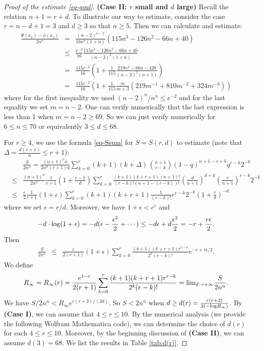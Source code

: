 \documentclass[12pt]{amsart}
\theoremstyle{definition}
\def\lim{{\rm lim}}
\def\log{{\rm log}}
\begin{document}
\begin{proof}[Proof of the estimate \eqref{eq-goal}]
\textbf{(Case II: $r$ small and $d$ large)}
    Recall the relation $n+1=r+d$. 
To illustrate our way to estimate, consider the case $r=n-d+1=3$ and $d\ge 3$ so that $n\ge 5$. 
Then we can calculate and estimate: 
\begin{eqnarray*}
    \frac{\Psi(x_1)-\phi(x_1)}{2n^n}&=& \frac{(n-2)^{n-2}}{16n^n(1+n)}(115n^3-126n^2-66n+40)\\
    &\le& \frac{e^{-2}}{16}\frac{115 n^3-126 n^2-66n+40}{(n-2)^2(1+n)}\\
    &=& \frac{115 e^{-2}}{16}\left(1+\frac{1}{115}\frac{{219} n^2-{66}n-{420}}{(n-2)^2(n+1)}\right)\\
    &=& \frac{115 e^{-2}}{16} \left(1+\frac{1}{115}\frac{m}{m+3}(219 m^{-1}+810 m^{-2}+324 m^{-3})\right)
\end{eqnarray*}
where for the first inequality we used $(n-2)^n/n^n\le e^{-2}$ and for the last equality we set  $m=n-2$. 
One can verify numerically that the last expression is less than 1 when $m=n-2\ge 69$. So we can just verify numerically for $6\le n\le 70$ or equivalently $3\le d\le 68$. 


For $r\ge 4$, we use the formula \eqref{eq-Ssum} for $S=S(r,d)$ to estimate (note that $\Delta=\frac{d(r+1)}{n}\le r+1$):  
\begin{eqnarray*}
    &&\frac{S}{2n^n}
    =\frac{(n+1)^n n}{2 n^n (r+1)d}\sum_{k=0}^{r}(k+1)(k+\Delta)\frac{}{}\binom{n+1}{r-k}(1-q)^{n+1-r+k} q^{r-k} 2^{-k}    
    \\
    &\le &\frac{(n+1)^n}{2n^n}\frac{1}{r+1}\left(1+\frac{r-1}{d}\right)\sum_{k=0}^r \frac{(k+1)(k+r+1)(n+1)!}{(r-k)!(n+1-(r-k))!}(\frac{d}{n+1})^{d+k}(\frac{r}{n+1})^{r-k}2^{-k}\\
    &\le& \frac{e}{2}\frac{1}{r+1}(1+\epsilon)\sum_{k=0}^r(k+1)(k+r+1)\frac{1}{(r-k)!}r^{r-k}2^{-k}(1+\frac{r}{d})^{-d}
\end{eqnarray*}
where we set $\epsilon=r/d$. Moreover, we have $1+\epsilon< e^\epsilon$ and
\begin{eqnarray*}
    -d\cdot \log (1+\epsilon)=-d (\epsilon-\frac{\epsilon^2}{2}+\cdots)\le -d\epsilon+d\frac{\epsilon^2}{2}=-r+\frac{r\epsilon}{2}.
\end{eqnarray*}
Then    \begin{eqnarray*}
     \frac{S}{2n^n} &\le& \frac{e}{2(r+1)}(1+\epsilon)\sum_{k=0}^r \frac{(k+1)(k+r+1)r^{r-k}}{2^k(r-k)!}e^{-r+r\epsilon/2}.
    \end{eqnarray*}
We define
\begin{equation}
    R_\infty=R_\infty(r)=\frac{e^{1-r}}{2(r+1)}\sum_{k=0}^r \frac{(k+1)(k+r+1)r^{r-k}}{2^k(r-k)!}=\lim_{d\rightarrow+\infty} \frac{S}{2n^n}.
\end{equation} 
We have $S/2n^n< R_{\infty} e^{r(r+2)/(2d)}$.
So $S< 2n^n$ when $d\ge d(r)=\frac{r(r+2)}{2(-\log R_\infty)}$.
By \textbf{(Case I)}, we can assume that $4\le r\le 10$. 
By the numerical analysis (we provide the following Wolfram Mathematica code), we can determine the choice of $d(r)$ for each $4\leq r \leq 10$. 
Moreover, by the beginning discussion of \textbf{(Case II)}, we can assume $d(3)=68$. We list the results in Table \ref{tab:d(r)}. 


\end{proof}
\end{document}
